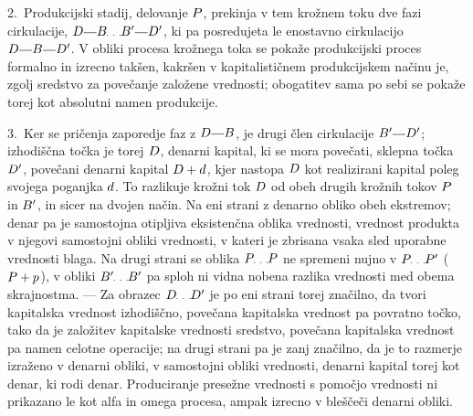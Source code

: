 \documentclass[kapital_02.tex]{subfiles}
\begin{document}
2.\ Produkcijski stadij, delovanje \(P\), prekinja v tem krožnem toku dve fazi cirkulacije, \(\KPED\KPEcrta\KPEB\KPEpike\KPEB'\KPEcrta\KPED'\), ki pa posredujeta le enostavno cirkulacijo \(\KPED\KPEcrta\KPEB\KPEcrta\KPED'\). V obliki procesa krožnega toka se pokaže produkcijski proces formalno in izrecno takšen, kakršen v kapitalističnem produkcijskem načinu je, zgolj sredstvo za povečanje založene vrednosti; obogatitev sama po sebi se pokaže torej kot absolutni namen produkcije.

3.\ Ker se pričenja zaporedje faz z \(\KPED\KPEcrta\KPEB\), je drugi člen cirkulacije \(\KPEB'\KPEcrta\KPED'\); izhodiščna točka je torej \(D\), denarni kapital, ki se mora povečati, sklepna točka \(D'\), povečani denarni kapital \(D + d\), kjer nastopa \(D\) kot realizirani kapital poleg svojega poganjka \(d\). To razlikuje krožni tok \(D\) od obeh drugih krožnih tokov \(P\) in \(B'\), in sicer na dvojen način. Na eni strani z denarno obliko obeh ekstremov; denar pa je samostojna otipljiva eksistenčna oblika vrednosti, vrednost produkta v njegovi samostojni obliki vrednosti, v kateri je zbrisana vsaka sled uporabne vrednosti blaga. Na drugi strani se oblika \(\KPEP\KPEpike\KPEP\) ne spremeni nujno v \(\KPEP\KPEpike\KPEP'\) (\(P + p\)), v obliki \(\KPEB'\KPEpike\KPEB'\) pa sploh ni vidna nobena razlika vrednosti med obema skrajnostma. --- Za obrazec \(\KPED\KPEpike\KPED'\) je po eni strani torej značilno, da tvori kapitalska vrednost izhodiščno, povečana kapitalska vrednost pa povratno točko, tako da je založitev kapitalske vrednosti sredstvo, povečana kapitalska vrednost pa namen celotne operacije; na drugi strani pa je zanj značilno, da je to razmerje izraženo v denarni obliki, v samostojni obliki vrednosti, denarni kapital torej kot denar, ki rodi denar. Produciranje presežne vrednosti s pomočjo vrednosti ni prikazano le kot alfa in omega procesa, ampak izrecno v bleščeči denarni obliki.
\end{document}
